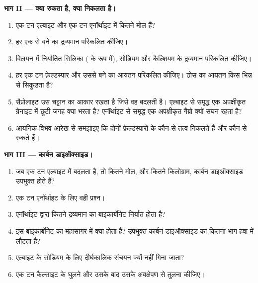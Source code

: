 \begin{problem}
\medskip
\noindent\textbf{भाग II --- क्या रुकता है, क्या निकलता है।}
\begin{enumerate}[resume]
  \item एक टन एल्बाइट और एक टन एनॉर्थाइट में कितने मोल हैं?
  \item हर एक से बने  का द्रव्यमान परिकलित कीजिए।
  \item विलयन में निर्यातित सिलिका ( के रूप में), सोडियम और कैल्शियम के द्रव्यमान परिकलित कीजिए।
  \item हर एक टन फ़ेल्डस्पार और उससे बने  का आयतन परिकलित कीजिए। ठोस का आयतन किस भिन्न से सिकुड़ता है?
  \item सैप्रोलाइट उस चट्टान का आकार रखता है जिसे वह बदलती है। एल्बाइट से समृद्ध एक अपक्षीकृत ग्रेनाइट में छूटी जगह क्या भरता है? एनॉर्थाइट से समृद्ध एक अपक्षीकृत गैब्रो क्यों सघन रहता है?
  \item आयनिक-विभव आरेख से समझाइए कि दोनों फ़ेल्डस्पारों के कौन-से तत्व निकलते हैं और कौन-से रुकते हैं।
\end{enumerate}

\medskip
\noindent\textbf{भाग III --- कार्बन डाइऑक्साइड।}
\begin{enumerate}[resume]
  \item जब एक टन एल्बाइट  में बदलता है, तो कितने मोल, और कितने किलोग्राम, कार्बन डाइऑक्साइड उपभुक्त होते हैं?
  \item एक टन एनॉर्थाइट के लिए वही प्रश्न।
  \item एनॉर्थाइट द्वारा कितने द्रव्यमान का बाइकार्बोनेट निर्यात होता है?
  \item इस बाइकार्बोनेट का महासागर में क्या होता है? उपभुक्त कार्बन डाइऑक्साइड का कितना भाग हवा में लौटता है?
  \item एल्बाइट के सोडियम के लिए दीर्घकालिक संचयन क्यों नहीं गिना जाता?
  \item एक टन कैल्साइट के घुलने और उसके बाद उसके अवक्षेपण से तुलना कीजिए।
\end{enumerate}


\end{problem}
